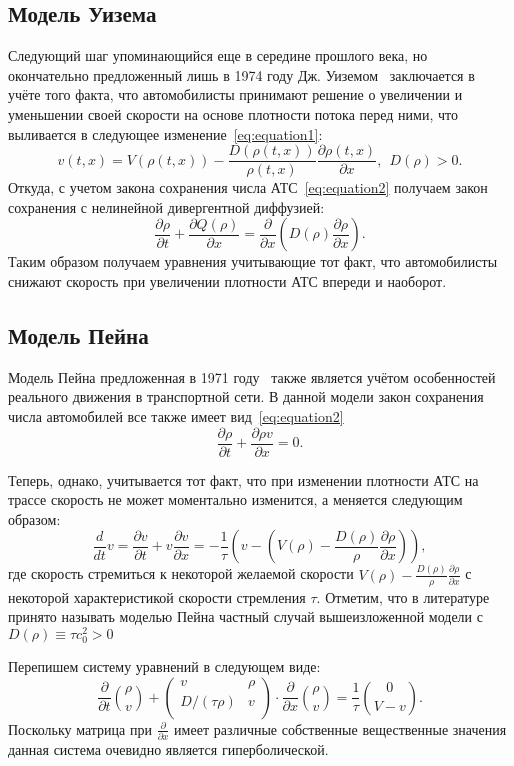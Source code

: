 \subsection{Модель Уизема}\label{subsec:ch1/sec1/sub3}
Следующий шаг упоминающийся еще в середине прошлого века, но окончательно предложенный лишь в 1974 году Дж. Уиземом~\cite{uisem1977linear} заключается в учёте того факта, что автомобилисты принимают решение о увеличении и уменьшении своей скорости на основе плотности потока перед ними, что выливается в следующее изменение~\ref{eq:equation1}:
\[
    v(t, x) = V(\rho(t, x)) - \frac{D(\rho(t, x))}{\rho(t,x)}\frac{\partial\rho(t,x)}{\partial x},\ \ D(\rho) > 0.
\]
Откуда, с учетом закона сохранения числа АТС~\ref{eq:equation2} получаем закон сохранения с нелинейной дивергентной диффузией:
\[
    \frac{\partial \rho}{\partial t} + \frac{\partial Q(\rho)}{\partial x} = \frac{\partial}{\partial x} \left(D(\rho) \frac{\partial \rho}{\partial x}\right).
\]
Таким образом получаем уравнения учитывающие тот факт, что автомобилисты снижают скорость при увеличении плотности АТС впереди и наоборот.


\subsection{Модель Пейна}\label{subsec:ch1/sec1/sub4}
Модель Пейна предложенная в 1971 году~\cite{payne1971model} также является учётом особенностей реального движения в транспортной сети.
В данной модели закон сохранения числа автомобилей все также имеет вид~\cref{eq:equation2}
\[
    \frac{\partial \rho}{\partial t} + \frac{\partial \rho v}{\partial x} = 0.
\]

Теперь, однако, учитывается тот факт, что при изменении плотности АТС на трассе скорость не может моментально изменится, а меняется следующим образом:
\[
\frac{d}{dt}v = \frac{\partial v}{\partial t} + v \frac{\partial v}{\partial x} = -\frac{1}{\tau} \left(v - \left(V(\rho) - \frac{D(\rho)}{\rho}\frac{\partial\rho}{\partial x}\right)\right),
\]
где скорость стремиться к некоторой желаемой скорости \( V(\rho) - \frac{D(\rho)}{\rho}\frac{\partial\rho}{\partial x}\) с некоторой характеристикой скорости стремления \(\tau\).
Отметим, что в литературе принято называть моделью Пейна частный случай вышеизложенной модели с \(D(\rho)\equiv\tau c_0^2 > 0\)

Перепишем систему уравнений в следующем виде:
\begin{equation}
    \label{eq:equation5}
  \frac{\partial}{\partial t}\binom{\rho}{v} +
  \left(
        \begin{array}{cc}
            v  & \rho \\
            D/(\tau\rho)  & v \\
        \end{array}
    \right)\cdot \frac{\partial}{\partial x} \binom{\rho}{v} = \frac{1}{\tau}\binom{0}{V-v}.
\end{equation}
Поскольку матрица при \(\frac{\partial}{\partial x}\) имеет различные собственные вещественные значения данная система очевидно является гиперболической.


